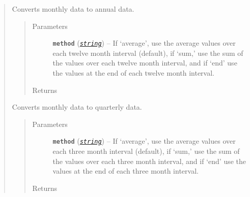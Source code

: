 \documentclass[letterpaper,10pt,openany,oneside]{sphinxmanual}
\begin{document}
\begin{fulllineitems}
\begin{quote}
\begin{fulllineitems}
\label{series_class:fredpy.series.monthtoannual}
Converts monthly data to annual data.
\begin{quote}\begin{description}
\item[{Parameters}] \leavevmode
\textbf{\texttt{method}} (\href{https://docs.python.org/library/string.html\#module-string}{\emph{\texttt{string}}}) -- If `average', use the average values over each twelve month interval (default), if `sum,' use the sum of the values over each twelve month interval, and if `end' use the values at the end of each twelve month interval.

\item[{Returns}] \leavevmode
{\hyperref[series_class:fredpy.series]{}}

\end{description}\end{quote}

\end{fulllineitems}


\begin{fulllineitems}
\label{series_class:fredpy.series.monthtoquarter}
Converts monthly data to quarterly data.
\begin{quote}\begin{description}
\item[{Parameters}] \leavevmode
\textbf{\texttt{method}} (\href{https://docs.python.org/library/string.html\#module-string}{\emph{\texttt{string}}}) -- If `average', use the average values over each three month interval (default), if `sum,' use the sum of the values over each three month interval, and if `end' use the values at the end of each three month interval.

\item[{Returns}] \leavevmode
{\hyperref[series_class:fredpy.series]{}}

\end{description}\end{quote}

\end{fulllineitems}



\end{quote}
\end{fulllineitems}
\end{document}
